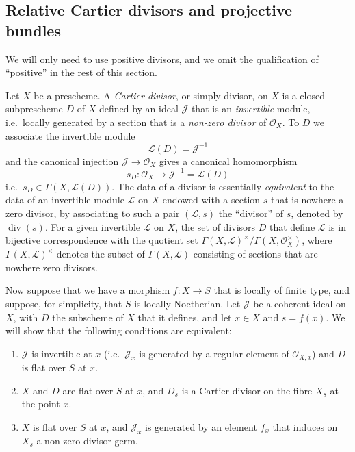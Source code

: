 \documentclass{article}
\providecommand{\tightlist}{%
  \setlength{\itemsep}{0pt}\setlength{\parskip}{0pt}}
\newcommand{\oldpage}[1]{\marginpar{\footnotesize$\Big\vert$ \textit{p.~#1}}}
\theoremstyle{definition}
\theoremstyle{definition}
\theoremstyle{definition}
\theoremstyle{definition}
\theoremstyle{remark}
\begin{document}
\hypertarget{fga-3-v-section-4}{%
\subsection{Relative Cartier divisors and projective bundles}\label{fga-3-v-section-4}}

We will only need to use positive divisors, and we omit the qualification of ``positive'' in the rest of this section.

Let \(X\) be a prescheme.
A \emph{Cartier divisor}, or simply divisor, on \(X\) is a closed subprescheme \(D\) of \(X\) defined by an ideal \({\mathscr{J}}\) that is an \emph{invertible} module, i.e.~locally generated by a section that is a \emph{non-zero divisor} of \({\mathscr{O}}_X\).
To \(D\) we associate the invertible module
\[
  {\mathscr{L}}(D)
  = {\mathscr{J}}^{-1}
\]
and the canonical injection \({\mathscr{J}}\to{\mathscr{O}}_X\) gives a canonical homomorphism
\[
  s_D\colon {\mathscr{O}}_X
  \to {\mathscr{J}}^{-1}
  = {\mathscr{L}}(D)
\]
i.e.~\(s_D\in\Gamma(X,{\mathscr{L}}(D))\).
The data of a divisor is essentially \emph{equivalent} to the data of an invertible module \({\mathscr{L}}\) on \(X\) endowed with a section \(s\) that is nowhere a zero divisor, by associating to such a pair \(({\mathscr{L}},s)\) the ``divisor'' of \(s\), denoted by \(\operatorname{div}(s)\).
\oldpage{232-09}For a given invertible \({\mathscr{L}}\) on \(X\), the set of divisors \(D\) that define \({\mathscr{L}}\) is in bijective correspondence with the quotient set \(\Gamma(X,{\mathscr{L}})^\times/\Gamma(X,{\mathscr{O}}_X^\times)\), where \(\Gamma(X,{\mathscr{L}})^\times\) denotes the subset of \(\Gamma(X,{\mathscr{L}})\) consisting of sections that are nowhere zero divisors.

Now suppose that we have a morphism \(f\colon X\to S\) that is locally of finite type, and suppose, for simplicity, that \(S\) is locally Noetherian.
Let \({\mathscr{J}}\) be a coherent ideal on \(X\), with \(D\) the subscheme of \(X\) that it defines, and let \(x\in X\) and \(s=f(x)\).
We will show that the following conditions are equivalent:

\begin{enumerate}
\def\labelenumi{\roman{enumi}.}
\tightlist
\item
  \({\mathscr{J}}\) is invertible at \(x\) (i.e.~\({\mathscr{J}}_x\) is generated by a regular element of \({\mathscr{O}}_{X,x}\)) and \(D\) is flat over \(S\) at \(x\).
\item
  \(X\) and \(D\) are flat over \(S\) at \(x\), and \(D_s\) is a Cartier divisor on the fibre \(X_s\) at the point \(x\).
\item
  \(X\) is flat over \(S\) at \(x\), and \({\mathscr{J}}_x\) is generated by an element \(f_x\) that induces on \(X_s\) a non-zero divisor germ.
\end{enumerate}
\end{document}
